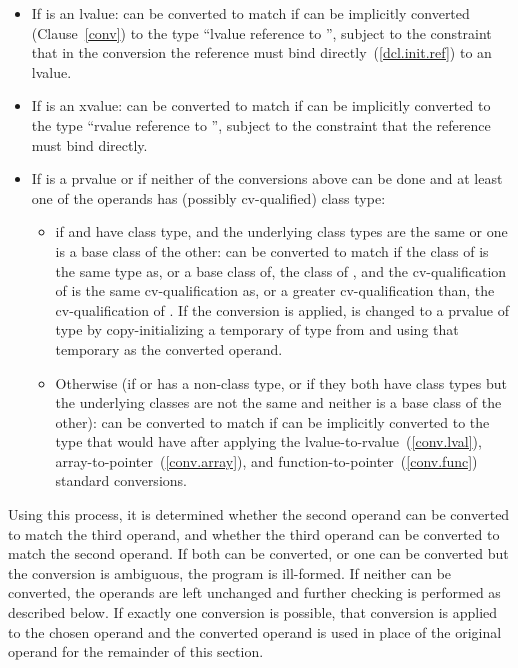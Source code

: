 \begin{itemize}
\item If  is an lvalue:  can be converted to match
 if  can be implicitly converted (Clause~\ref{conv})
to the type ``lvalue reference to '', subject to the
constraint that in the conversion the reference must bind
directly~(\ref{dcl.init.ref}) to an lvalue.

\item If  is an xvalue:  can be converted to match 
if  can be implicitly converted to the type ``rvalue reference to '',
subject to the constraint that the reference must bind directly.

\item If  is a prvalue or if neither of the conversions above can be
done and at least one of the operands has (possibly cv-qualified) class type:

\begin{itemize}
\item if  and  have class type, and the underlying
class types are the same or one is a base class of the other: 
can be converted to match  if the class of  is the
same type as, or a base class of, the class of , and the
cv-qualification of  is the same cv-qualification as, or a
greater cv-qualification than, the cv-qualification of . If
the conversion is applied,  is changed to a prvalue of type
 by copy-initializing a temporary of type  from
 and using that temporary as the converted operand.

\item Otherwise (if  or  has a non-class type,
or if they both have class types but the underlying classes are not
the same and neither is a base class of the other):  can be
converted to match  if  can be implicitly converted
to the type that  would have
after applying the
lvalue-to-rvalue~(\ref{conv.lval}),
array-to-pointer~(\ref{conv.array}), and
function-to-pointer~(\ref{conv.func})
standard conversions.
\end{itemize}
\end{itemize}

Using this process, it is determined whether the second operand can be
converted to match the third operand, and whether the third operand can
be converted to match the second operand. If both can be converted, or
one can be converted but the conversion is ambiguous, the program is
ill-formed. If neither can be converted, the operands are left unchanged
and further checking is performed as described below. If exactly one
conversion is possible, that conversion is applied to the chosen operand
and the converted operand is used in place of the original operand for
the remainder of this section.

